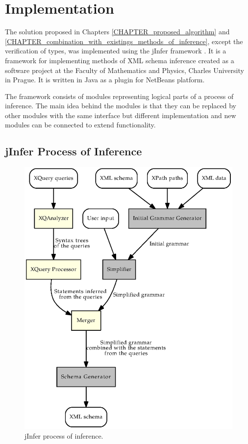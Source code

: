 \chapter{Implementation}
The solution proposed in Chapters \ref{CHAPTER_proposed_algorithm} and \ref{CHAPTER_combination_with_existings_methods_of_inference}, except the verification of types, was implemented using the jInfer framework \cite{jinfer}. It is a framework for implementing methods of XML schema inference created as a software project at the Faculty of Mathematics and Physics, Charles University in Prague. It is written in Java as a plugin for NetBeans platform.

The framework consists of modules representing logical parts of a process of inference. The main idea behind the modules is that they can be replaced by other modules with the same interface but different implementation and new modules can be connected to extend functionality.

\section{jInfer Process of Inference}
\begin{figure}
\label{FIG_jinfer_steps}
\caption{jInfer process of inference.}
\includegraphics[scale=0.9]{jinfer_steps.eps}
\end{figure}

